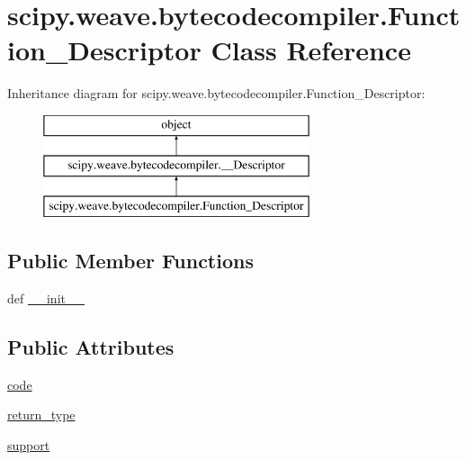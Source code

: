 \hypertarget{classscipy_1_1weave_1_1bytecodecompiler_1_1Function__Descriptor}{}\section{scipy.\+weave.\+bytecodecompiler.\+Function\+\_\+\+Descriptor Class Reference}
\label{classscipy_1_1weave_1_1bytecodecompiler_1_1Function__Descriptor}
Inheritance diagram for scipy.\+weave.\+bytecodecompiler.\+Function\+\_\+\+Descriptor\+:\begin{figure}[H]
\begin{center}
\leavevmode
\includegraphics[height=3.000000cm]{classscipy_1_1weave_1_1bytecodecompiler_1_1Function__Descriptor}
\end{center}
\end{figure}
\subsection*{Public Member Functions}
\begin{DoxyCompactItemize}
\item 
def \hyperlink{classscipy_1_1weave_1_1bytecodecompiler_1_1Function__Descriptor_a319be03597efbafc5d9bb143caccfbf9}{\+\_\+\+\_\+init\+\_\+\+\_\+}
\end{DoxyCompactItemize}
\subsection*{Public Attributes}
\begin{DoxyCompactItemize}
\item 
\hyperlink{classscipy_1_1weave_1_1bytecodecompiler_1_1Function__Descriptor_ada6faa0928717efc6792ed5553adcca9}{code}
\item 
\hyperlink{classscipy_1_1weave_1_1bytecodecompiler_1_1Function__Descriptor_a4456b0a791394c790bf7939c3a26b305}{return\+\_\+type}
\item 
\hyperlink{classscipy_1_1weave_1_1bytecodecompiler_1_1Function__Descriptor_a55e8b4d363dd1d6725fddb8522f9126e}{support}
\end{DoxyCompactItemize}
